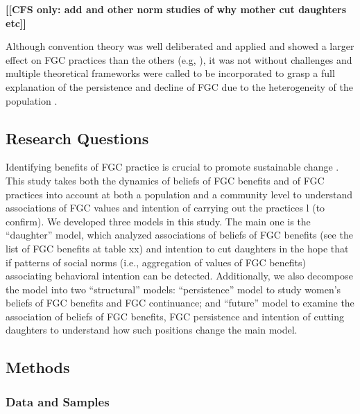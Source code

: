\documentclass[12pt,]{article}
\newcommand{\comment}[1]{\textbf{[[#1]]}}
\newcommand{\cfonly}[1]{\comment{CFS only: #1}}
\begin{document}
{\cfonly{add \cite{AlcaGonz13, BellNova15, PashPonn16, Rima08, ShelWand11, more} and other norm studies of why mother cut daughters etc}

Although convention theory was well deliberated and applied and showed a larger effect on FGC practices than the others (e.g, \cite{BoylMcMo02, BoylCorl10, FreyJohn07, FrieMahm13, Hayf05, KandMwek09, Mack96, Mack06, ReigGonz14, YirgKass12}),  it was not without challenges \cite{EffeVogt15} and multiple theoretical frameworks were called to be incorporated to grasp a full explanation of the persistence and decline of FGC due to the heterogeneity of the population \cite{EffeVogt15, ModrLiu13}.  


\subsection{Research Questions}\label{research-questions}

Identifying benefits of FGC practice is crucial to promote sustainable change \cite{EffeVogt15}.  This study takes both the dynamics of beliefs of FGC benefits and of FGC practices into account at both a population and a community level to understand associations of FGC values and intention of carrying out the practices l \cite{BoylCorl010, Drol11,Hayf05, HayfTrin11, Grue05, Hodg11,KandNwak09, OdukAfol17} (to confirm).  We developed three models in this study.  The main one is the “daughter” model, which analyzed associations of beliefs of FGC benefits (see the list of FGC benefits at table xx) and intention to cut daughters in the hope that if patterns of social norms (i.e., aggregation of values of FGC benefits) associating behavioral intention can be detected.  Additionally, we also decompose the model into two “structural” models:  “persistence” model to study women’s beliefs of FGC benefits and FGC continuance; and “future” model to examine the association of beliefs of FGC benefits, FGC persistence and intention of cutting daughters to understand how such positions change the main model.

\subsection{Methods}\label{methods}

\subsubsection{Data and Samples}\label{data-and-samples}

}
\end{document}
